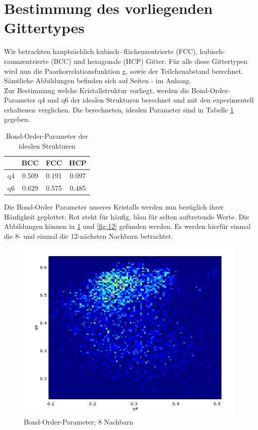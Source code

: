 \section{Bestimmung des vorliegenden Gittertypes}

Wir betrachten hauptsächlich kubisch\,-\,flächenzentrierte (FCC), kubisch-raumzentrierte (BCC) und hexagonale (HCP) Gitter. Für alle diese Gittertypen wird nun die Paarkorrelationsfunktion g, sowie der Teilchenabstand berechnet. Sämtliche Abbildungen befinden sich auf Seiten \pageref{fig:bccxy}-\pageref{fig:hcpg} im Anhang.
\\
Zur Bestimmung welche Kristallstruktur vorliegt, werden die Bond-Order-Parameter q4 und q6 der idealen Strukturen berechnet und mit den experimentell erhaltenen verglichen. Die berechneten, idealen Parameter sind in Tabelle \ref{tab:bondorder} gegeben.

\begin{table}[ht]
    \centering
    \begin{tabular}{c|ccc}
         & BCC & FCC & HCP \\\hline
         q4 &  0.509 & 0.191 & 0.097\\
         q6 &  0.629 & 0.575 & 0.485\\
    \end{tabular}
    \caption{Bond-Order-Parameter der idealen Strukturen}
    \label{tab:bondorder}
\end{table}

Die Bond-Order Parameter unseres Kristalls werden nun bezüglich ihrer Häufigkeit geplottet: Rot steht für häufig, blau für selten auftretende Werte. Die Abbildungen können in \ref{fig:08} und \ref{fig:12} gefunden werden. Es werden hierfür einmal die 8- und einmal die 12-nächsten Nachbarn betrachtet.

\begin{figure}[ht]
    \centering
    \includegraphics[scale=0.75]{data/rotationinvarianz08.PNG}
    \caption{Bond-Order-Parameter; 8 Nachbarn}
    \label{fig:08}
\end{figure}

